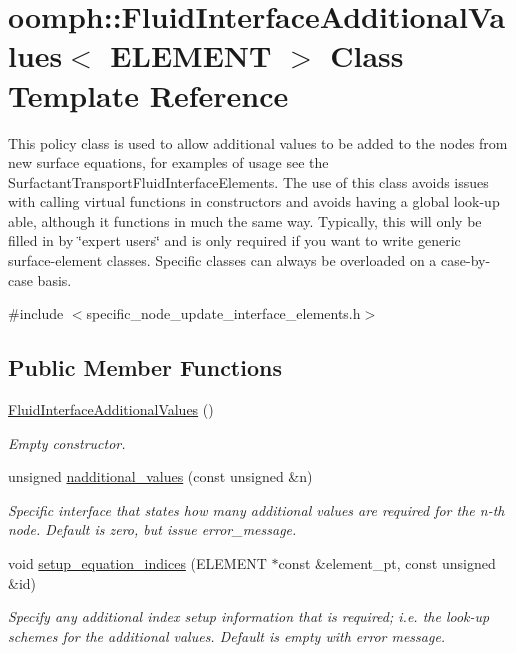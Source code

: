 \hypertarget{classoomph_1_1FluidInterfaceAdditionalValues}{}\section{oomph\+:\+:Fluid\+Interface\+Additional\+Values$<$ E\+L\+E\+M\+E\+NT $>$ Class Template Reference}
\label{classoomph_1_1FluidInterfaceAdditionalValues}


This policy class is used to allow additional values to be added to the nodes from new surface equations, for examples of usage see the Surfactant\+Transport\+Fluid\+Interface\+Elements. The use of this class avoids issues with calling virtual functions in constructors and avoids having a global look-\/up able, although it functions in much the same way. Typically, this will only be filled in by \char`\"{}expert users\char`\"{} and is only required if you want to write generic surface-\/element classes. Specific classes can always be overloaded on a case-\/by-\/case basis.  




{\ttfamily \#include $<$specific\+\_\+node\+\_\+update\+\_\+interface\+\_\+elements.\+h$>$}

\subsection*{Public Member Functions}
\begin{DoxyCompactItemize}
\item 
\hyperlink{classoomph_1_1FluidInterfaceAdditionalValues_a90883b471723538d92a28fb691ce7230}{Fluid\+Interface\+Additional\+Values} ()
\begin{DoxyCompactList}\small\item\em Empty constructor. \end{DoxyCompactList}\item 
unsigned \hyperlink{classoomph_1_1FluidInterfaceAdditionalValues_a20e916575114dcb64be896c777dbcbb8}{nadditional\+\_\+values} (const unsigned \&n)
\begin{DoxyCompactList}\small\item\em Specific interface that states how many additional values are required for the n-\/th node. Default is zero, but issue error\+\_\+message. \end{DoxyCompactList}\item 
void \hyperlink{classoomph_1_1FluidInterfaceAdditionalValues_aaf63152daba918213fbd512e6d5a6c32}{setup\+\_\+equation\+\_\+indices} (E\+L\+E\+M\+E\+NT $\ast$const \&element\+\_\+pt, const unsigned \&id)
\begin{DoxyCompactList}\small\item\em Specify any additional index setup information that is required; i.\+e. the look-\/up schemes for the additional values. Default is empty with error message. \end{DoxyCompactList}\end{DoxyCompactItemize}
